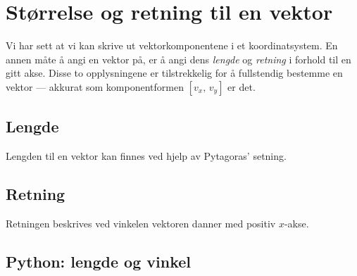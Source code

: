 \section{Størrelse og retning til en vektor}

Vi har sett at vi kan skrive ut vektorkomponentene i et koordinatsystem. En annen måte å angi en vektor på, er å angi dens \emph{lengde} og \emph{retning} i forhold til en gitt akse. Disse to opplysningene er tilstrekkelig for å fullstendig bestemme en vektor — akkurat som komponentformen $[v_x,\, v_y]$ er det.

\subsection*{Lengde}

Lengden til en vektor kan finnes ved hjelp av Pytagoras' setning.


\subsection*{Retning}

Retningen beskrives ved vinkelen vektoren danner med positiv $x$-akse.



\subsection*{Python: lengde og vinkel}

